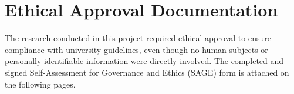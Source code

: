\chapter{Ethical Approval Documentation}

The research conducted in this project required ethical approval to ensure compliance with university guidelines, even though no human subjects or personally identifiable information were directly involved. The completed and signed Self-Assessment for Governance and Ethics (SAGE) form is attached on the following pages.

% 
